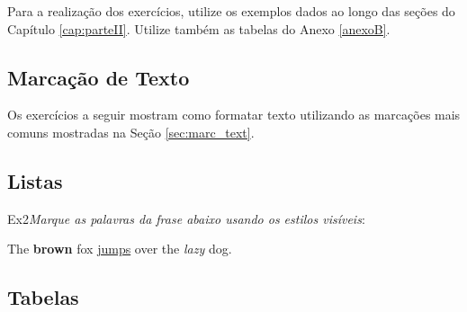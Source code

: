 Para a realização dos exercícios, utilize os exemplos dados ao longo das seções do Capítulo \ref{cap:parteII}. Utilize também as tabelas do Anexo \ref{anexoB}.

\tcbstartrecording

\subsection*{Marcação de Texto}
\label{sec:exec_mar_text}

Os exercícios a seguir mostram como formatar texto utilizando as marcações mais comuns mostradas na Seção \ref{sec:marc_text}.


\subsection*{Listas}
\label{sec:exec_listas}

\begin{texercise}{Ex2}\textit{Marque as palavras da frase abaixo usando os estilos visíveis}:\par\smallskip%
\begin{tcboutputlisting}
\begin{center}
    The \textbf{brown} fox \underline{jumps} over the \textit{lazy} dog.
\end{center}
\end{tcboutputlisting}
\tcbuselistingtext%
\end{texercise}

\subsection*{Tabelas}
\label{sec:exec_tabelas}

